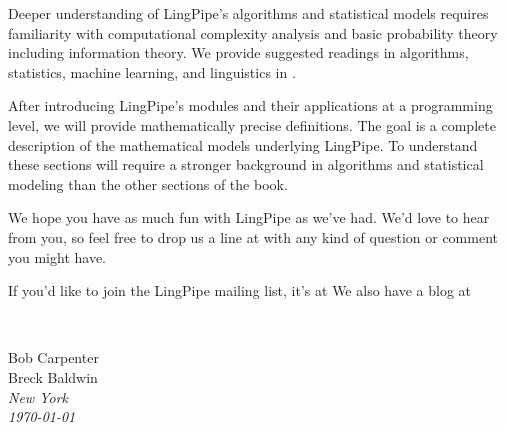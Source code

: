 Deeper understanding of LingPipe's algorithms and statistical models
requires familiarity with computational complexity analysis and basic
probability theory including information theory.  We provide suggested
readings in algorithms, statistics, machine learning, and linguistics
in .

After introducing LingPipe's modules and their applications at a
programming level, we will provide mathematically precise definitions.
The goal is a complete description of the mathematical models
underlying LingPipe.  To understand these sections will require a
stronger background in algorithms and statistical modeling than
the other sections of the book.

We hope you have as much fun with LingPipe as we've had.  We'd love to
hear from you, so feel free to drop us a line at
 with any kind of question or comment you
might have.

If you'd like to join the LingPipe mailing list, it's at
%
%
We also have a blog at
%



\newlength{\sigWidth}
\mbox{ }
\hfill
\parbox{\sigWidth}{
Bob Carpenter
\\[2pt]
Breck Baldwin
\\[2pt]\small
\it New York
\\
\today}

